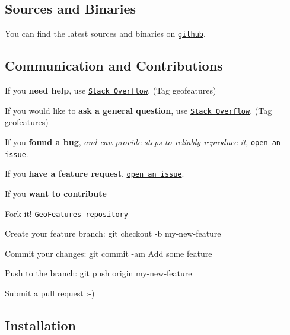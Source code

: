 \subsection*{Sources and Binaries}

You can find the latest sources and binaries on \href{https://github.com/tonystone/geofeatures}{\tt github}.

\subsection*{Communication and Contributions}


\begin{DoxyItemize}
\item If you {\bfseries need help}, use \href{http://stackoverflow.com/questions/tagged/geofeatures}{\tt Stack Overflow}. (Tag \textquotesingle{}geofeatures\textquotesingle{})
\item If you would like to {\bfseries ask a general question}, use \href{http://stackoverflow.com/questions/tagged/geofeatures}{\tt Stack Overflow}. (Tag \textquotesingle{}geofeatures\textquotesingle{})
\item If you {\bfseries found a bug}, {\itshape and can provide steps to reliably reproduce it}, \href{https://github.com/tonystone/geofeatures/issues}{\tt open an issue}.
\item If you {\bfseries have a feature request}, \href{https://github.com/tonystone/geofeatures/issues}{\tt open an issue}.
\item If you {\bfseries want to contribute}
\begin{DoxyItemize}
\item Fork it! \href{https://github.com/tonystone/geofeatures}{\tt Geo\+Features repository}
\item Create your feature branch\+: {\ttfamily git checkout -\/b my-\/new-\/feature}
\item Commit your changes\+: {\ttfamily git commit -\/am \textquotesingle{}Add some feature\textquotesingle{}}
\item Push to the branch\+: {\ttfamily git push origin my-\/new-\/feature}
\item Submit a pull request \+:-\/)
\end{DoxyItemize}
\end{DoxyItemize}

\subsection*{Installation}

